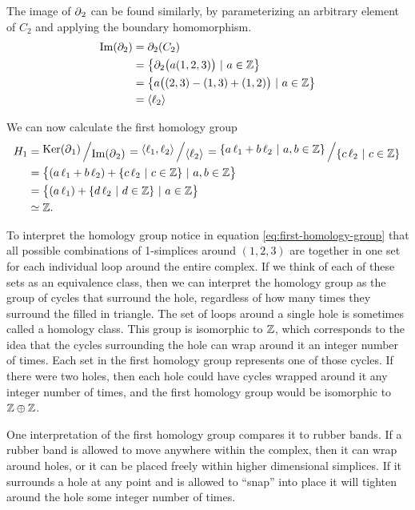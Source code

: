 \begin{example}
    The image of \(\operatorname{\partial}_2\) can be found similarly, by parameterizing an arbitrary element of \(C_2\) and applying the boundary homomorphism.
    \begin{align}
        \operatorname{Im} (\partial_2)   &= \partial_2 (C_2) \\
            &= \left\{ \partial_2 \big( a(1,2,3) \big)\ |\ a \in \mathbb{Z} \right\} \\
            &= \left\{ a\big((2,3) - (1,3) + (1,2) \big)\ |\ a \in \mathbb{Z} \right\}\\
            &= \langle \ell_2 \rangle
    \end{align}

    We can now calculate the first homology group
    \begin{align}
        H_1 &= \bigslant{\Ker(\boundary_1)}{\Ima(\boundary_{2})}
        = \bigslant{\langle \ell_1, \ell_2 \rangle}{\langle \ell_2 \rangle}
        = \bigslant{\{ a\,\ell_1 + b\,\ell_2\ |\ a,b \in \Z \}}{\{ c\,\ell_2\ |\ c \in \Z \}} \\
        &= \big\{ (a\,\ell_1 + b\,\ell_2) + \{ c\,\ell_2\ |\ c \in \Z \}\ |\ a,b \in \Z \big\} \\
        &= \big\{ (a\,\ell_1) + \{ d\,\ell_2\ |\ d \in \Z \}\ |\ a \in \Z \big\} \label{eq:first-homology-group}\\
        &\simeq \Z
        .
    \end{align}

    To interpret the homology group notice in equation \eqref{eq:first-homology-group} that all possible combinations of 1-simplices around \((1,2,3)\) are together in one set for each individual loop around the entire complex.
    If we think of each of these sets as an equivalence class, then we can interpret the homology group as the group of cycles that surround the hole, regardless of how many times they surround the filled in triangle.
    The set of loops around a single hole is sometimes called a homology class.
    This group is isomorphic to \(\mathbb{Z}\), which corresponds to the idea that the cycles surrounding the hole can wrap around it an integer number of times.
    Each set in the first homology group represents one of those cycles.
    If there were two holes, then each hole could have cycles wrapped around it any integer number of times, and the first homology group would be isomorphic to \(\mathbb{Z} \oplus \mathbb{Z}\).

    One interpretation of the first homology group compares it to rubber bands.
    If a rubber band is allowed to move anywhere within the complex, then it can wrap around holes, or it can be placed freely within higher dimensional simplices.
    If it surrounds a hole at any point and is allowed to ``snap'' into place it will tighten around the hole some integer number of times.
\end{example}

